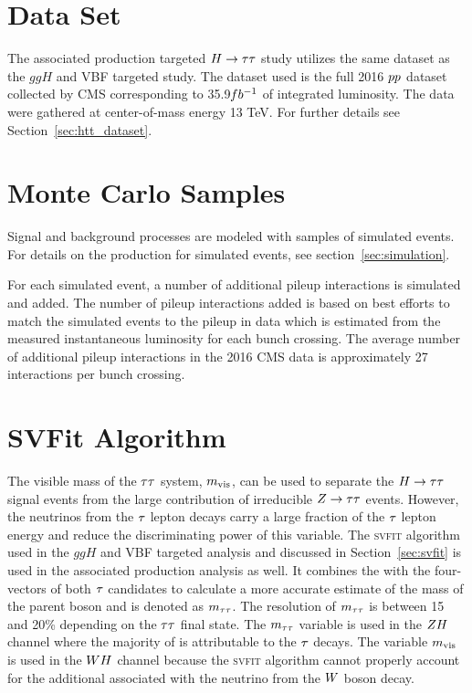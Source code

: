 \section{Data Set}
\label{sec:vh_dataset}
The associated production targeted $H\to\tau\tau$ study utilizes the same dataset as the
$ggH$ and VBF targeted study. The dataset used is the full 2016 $pp$ 
dataset collected by CMS corresponding to 35.9$fb^{-1}$ 
of integrated luminosity. The data were gathered at center-of-mass energy 13 TeV.
For further details see Section~\ref{sec:htt_dataset}.



\section{Monte Carlo Samples}
\label{sec:vh_mc_samples}
Signal and background processes are modeled with samples of simulated events.
For details on the production for simulated events, see section~\ref{sec:simulation}.

For each simulated event, a number of additional pileup interactions is simulated and added. 
The number of pileup interactions added is based on best efforts to match the simulated
events to the pileup in data which is estimated from the measured instantaneous
luminosity for each bunch crossing. The average number of additional pileup interactions in
the 2016 CMS data is approximately 27 interactions per bunch crossing.



\section{SVFit Algorithm}
The visible mass of the $\tau\tau$ system, $m_\text{vis}$, can be used to separate
the $H\to \tau \tau$ signal events
from the large contribution of irreducible $Z \to \tau \tau$ events.
However, the neutrinos from the $\tau$ lepton decays carry a large fraction of
the $\tau$ lepton energy and reduce the discriminating power of this variable.
The \textsc{svfit} algorithm used in the $ggH$ and VBF targeted analysis
and discussed in Section~\ref{sec:svfit} is used in the associated production
analysis as well. It combines the \etvecmiss 
with the four-vectors of both $\tau$ candidates to calculate a more accurate 
estimate of the mass of the parent boson and is denoted as $m_{\tau\tau}$. The resolution 
of $m_{\tau\tau}$ is between 15 and 20\% depending on the $\tau\tau$ final state. The 
$m_{\tau\tau}$ variable is used in the $ZH$ channel where the majority of 
\etvecmiss is attributable to the $\tau$ decays. The variable $m_\text{vis}$ is used in the 
$WH$ channel because the \textsc{svfit} algorithm cannot properly account for the 
additional \etvecmiss associated with the neutrino from the $W$ boson decay. 




